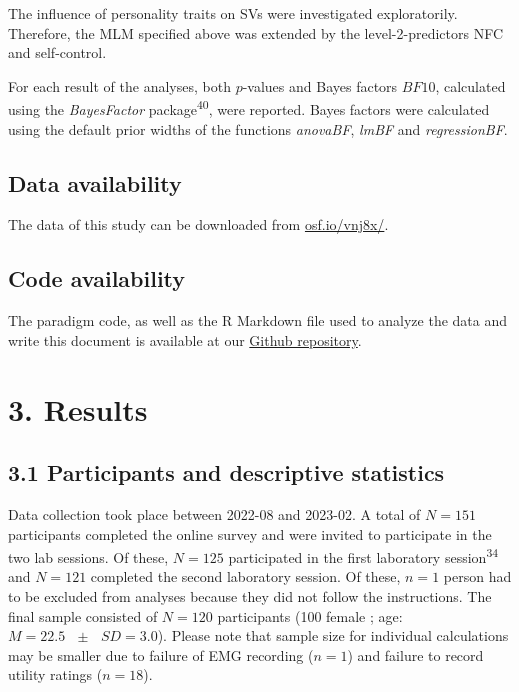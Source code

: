 \documentclass[
  man,floatsintext]{apa6}
\begin{document}
The influence of personality traits on SVs were investigated exploratorily.
Therefore, the MLM specified above was extended by the level-2-predictors NFC and self-control.

For each result of the analyses, both \(p\)-values and Bayes factors \(BF10\), calculated using the \emph{BayesFactor} package\textsuperscript{40}, were reported.
Bayes factors were calculated using the default prior widths of the functions \emph{anovaBF}, \emph{lmBF} and \emph{regressionBF}.

\hypertarget{data-availability}{%
\subsection{Data availability}\label{data-availability}}

The data of this study can be downloaded from \href{https://osf.io/vnj8x/}{osf.io/vnj8x/}.

\hypertarget{code-availability}{%
\subsection{Code availability}\label{code-availability}}

The paradigm code, as well as the R Markdown file used to analyze the data and write this document is available at our \href{https://github.com/ChScheffel/CAD}{Github repository}.

\hypertarget{results}{%
\section{3. Results}\label{results}}

\hypertarget{participants-and-descriptive-statistics}{%
\subsection{3.1 Participants and descriptive statistics}\label{participants-and-descriptive-statistics}}

Data collection took place between 2022-08 and 2023-02.
A total of \(N=151\) participants completed the online survey and were invited to participate in the two lab sessions.
Of these, \(N=125\) participated in the first laboratory session\textsuperscript{34} and \(N=121\) completed the second laboratory session.
Of these, \(n=1\) person had to be excluded from analyses because they did not follow the instructions.
The final sample consisted of \(N=120\) participants (100 female ; age: \(M=22.5\text{ }\pm\text{ }SD = 3.0\)).
Please note that sample size for individual calculations may be smaller due to failure of EMG recording (\(n=1\)) and failure to record utility ratings (\(n=18\)).
\end{document}

